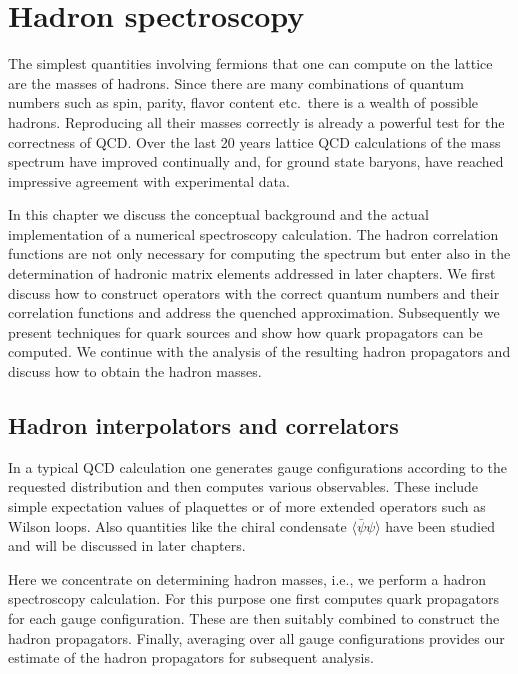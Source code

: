 
\chapter{Hadron spectroscopy}

The simplest quantities involving fermions that one can compute on the lattice
are the masses of hadrons. Since there are many combinations of quantum
numbers such as spin, parity, flavor content etc.\ there is a wealth of
possible hadrons. Reproducing all their masses correctly is already a powerful
test for the correctness of QCD. Over the last 20 years lattice QCD
calculations of the mass spectrum have improved continually and, for ground
state baryons, have reached impressive agreement with experimental data.

In this chapter we discuss the conceptual background and the actual
implementation of a numerical spectroscopy calculation. The hadron correlation
functions are not only necessary for computing the spectrum but enter also in
the determination of hadronic matrix elements addressed in later chapters. We
first discuss how to construct operators with the correct quantum numbers and
their correlation functions and address the quenched approximation.
Subsequently we present techniques for quark sources and show how quark
propagators can be computed. We continue with the analysis of the resulting
hadron propagators and discuss how to obtain the hadron masses.

\section{Hadron interpolators and correlators}

In a typical QCD calculation one generates gauge configurations according to
the requested distribution and then computes various observables. These
include simple expectation values of plaquettes or of more extended operators
such as Wilson loops. Also quantities like the chiral condensate
$\langle\bar\psi\psi\rangle$ have been studied and will be discussed in later
chapters.

Here we concentrate on determining hadron masses, i.e., we perform a hadron
spectroscopy calculation. For this purpose one first computes quark
propagators for each gauge configuration. These are then suitably combined to
construct the hadron propagators. Finally, averaging over all gauge
configurations provides our estimate of the hadron propagators for subsequent
analysis.

